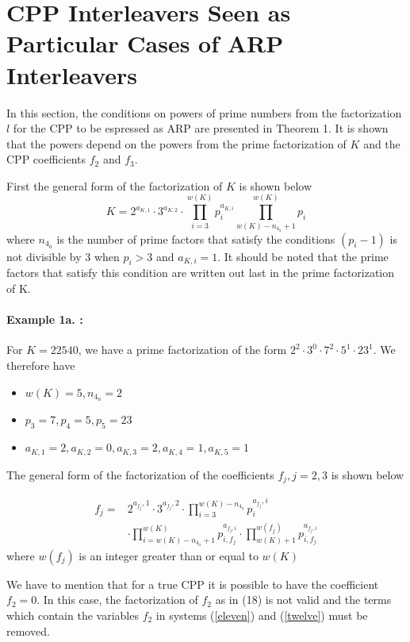\documentclass[fontsize=12pt]{article}
\newcommand{\cd}{\cdot}
\begin{document}
  \section{CPP Interleavers Seen as Particular Cases
of ARP Interleavers }
In this section, the conditions on powers of prime numbers from the factorization $l$ for the CPP to be espressed as ARP are presented in Theorem 1. It is shown that the powers depend on the powers from the prime factorization of $K$ and the CPP coefficients $f_2$ and $f_3$. 

First the general form of the factorization of $K$ is shown below
\begin{equation}
 K =2^{a_{K,1}}\cdot 3^{a_{K,2}}\cdot \prod^{w(K)}_{i=3}p_i^{a_{K,i}}
 \prod^{w(K)}_{w(K)-n_{4_a}+1}p_i
\end{equation}
where $n_{4_a}$ is the number of prime factors that satisfy the conditions $(p_i-1)$ is not divisible by $3$ when $p_i>3$ and $a_{K,i}=1$. It should be noted that the prime factors that satisfy this condition are written out last in the prime factorization of K. 

\paragraph{Example 1a. : }
For $K=22540$, we have a prime factorization of the form $2^2\cd 3^0\cd 7^2\cd 5^1 \cd 23^1$. We therefore have 
\begin{itemize}\item$w(K)=5, n_{4_a}=2$
\item  $p_3=7, p_4 = 5, p_5=23$
\item $a_{K,1}=2, a_{K,2}=0, a_{K,3}=2,a_{K,4}=1, a_{K,5}=1$
\end{itemize}

The general form of the  factorization of the coefficients $f_j, j=2,3$ is shown below

\begin{equation}
\begin{split}
f_j= &2^{a_{f_j},1}\cd 3^{a_{f_j},2}\cd \prod^{w(K)-n_{4_a}}_{i=3} p_i^{a_{f_j},i}\\
&\cd \prod^{w(K)}_{i=w(K)-n_{4_a}+1} p_{i,f_j}^{a_{f_j,i}} \cd \prod_{w(K)+1}^{w(f_j)} p_{i,f_j}^{a_{f_j,i}}
\end{split}
\label{fourteen}
\end{equation}
where $w(f_j)$ is an integer greater than or equal to $w(K)$

We have to mention that for a true
CPP it is possible to have the coefficient $f_2 = 0$. In this case, the
factorization of $f_2$ as in (18) is not valid and the terms
which contain the variables $f_2$ in systems (\ref{eleven}) and (\ref{twelve}) must
be removed.
\end{document}
